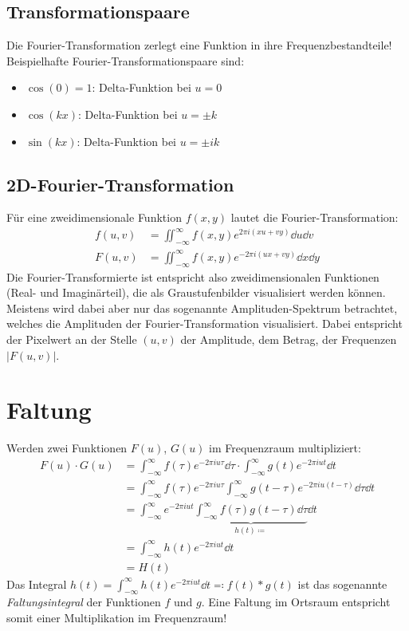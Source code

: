 		\subsection{Transformationspaare}
			Die Fourier-Transformation zerlegt eine Funktion in ihre Frequenzbestandteile! Beispielhafte Fourier-Transformationspaare sind:
			\begin{itemize}
				\item \( \cos(0) = 1 \): \tabto{2.5cm} Delta-Funktion bei \( u = 0 \)
				\item \( \cos(kx) \):    \tabto{2.5cm} Delta-Funktion bei \( u = \pm k \)
				\item \( \sin(kx) \):    \tabto{2.5cm} Delta-Funktion bei \( u = \pm ik \)
			\end{itemize}
		
		\subsection{2D-Fourier-Transformation}
			Für eine zweidimensionale Funktion \( f(x, y) \) lautet die Fourier-Transformation:
			\begin{align*}
				f(u, v) &= \iint_{-\infty}^{\infty} \! f(x, y) e^{ 2\pi i (xu + vy)} \dd{u} \dd{v} \\
				F(u, v) &= \iint_{-\infty}^{\infty} \! f(x, y) e^{-2\pi i (ux + vy)} \dd{x} \dd{y}
			\end{align*}
			Die Fourier-Transformierte ist entspricht also zweidimensionalen Funktionen (Real- und Imaginärteil), die als Graustufenbilder visualisiert werden können. Meistens wird dabei aber nur das sogenannte Amplituden-Spektrum betrachtet, welches die Amplituden der Fourier-Transformation visualisiert. Dabei entspricht der Pixelwert an der Stelle \( (u, v) \) der Amplitude, \dh dem Betrag, der Frequenzen \( \big\lvert F(u, v) \big\rvert \).

	\section{Faltung}
		Werden zwei Funktionen \( F(u) \), \( G(u) \) im Frequenzraum multipliziert:
		\begin{align*}
			F(u) \cdot G(u)
				&= \int_{-\infty}^{\infty} \! f(\tau) e^{-2\pi i u \tau} \dd{\tau} \cdot \int_{-\infty}^{\infty} \! g(t) e^{-2\pi i u t} \dd{t} \\
				&= \int_{-\infty}^{\infty} \! f(\tau) e^{-2\pi i u \tau} \int_{-\infty}^{\infty} \! g(t - \tau) e^{-2\pi i u (t - \tau)} \dd{\tau} \dd{t} \\
				&= \int_{-\infty}^{\infty} \! e^{-2\pi i u t} \underbrace{\int_{-\infty}^{\infty} \! f(\tau) g(t - \tau) \dd{\tau}}_{h(t) \coloneqq} \dd{t} \\
				&= \int_{-\infty}^{\infty} \! h(t) e^{-2\pi i u t} \dd{t} \\
				&= H(t)
		\end{align*}
		Das Integral \( h(t) = \int_{-\infty}^{\infty} \! h(t) e^{-2\pi i u t} \dd{t} \eqqcolon f(t) \ast g(t) \) ist das sogenannte \emph{Faltungsintegral} der Funktionen \(f\) und \(g\). Eine Faltung im Ortsraum entspricht somit einer Multiplikation im Frequenzraum!
		
